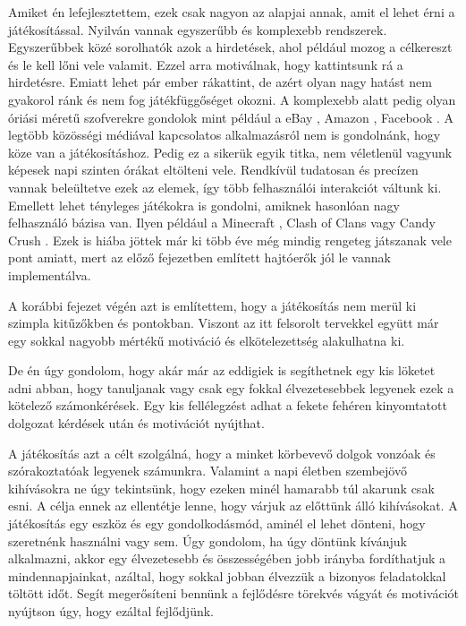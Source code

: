 


Amiket én lefejlesztettem, ezek csak nagyon az alapjai annak, amit el lehet érni a játékosítással. Nyilván vannak egyszerűbb és komplexebb rendszerek. Egyszerűbbek közé sorolhatók azok a hirdetések, ahol például mozog a célkereszt és le kell lőni vele valamit. Ezzel arra motiválnak, hogy kattintsunk rá a hirdetésre. Emiatt lehet pár ember rákattint, de azért olyan nagy hatást nem gyakorol ránk és nem fog játékfüggőséget okozni. A komplexebb alatt pedig olyan óriási méretű szofverekre gondolok mint például a eBay \cite{ebay}, Amazon \cite{amazon}, Facebook \cite{facebook}. A legtöbb közösségi médiával kapcsolatos alkalmazásról nem is gondolnánk, hogy köze van a játékosításhoz. Pedig ez a sikerük egyik titka, nem véletlenül vagyunk képesek napi szinten órákat eltölteni vele. Rendkívül tudatosan és precízen vannak beleültetve ezek az elemek, így több felhasználói interakciót váltunk ki. Emellett lehet tényleges játékokra is gondolni, amiknek hasonlóan nagy felhasználó bázisa van. Ilyen például a Minecraft \cite{minecraft}, Clash of Clans \cite{clashOfClans} vagy Candy Crush \cite{candycrush}. Ezek is hiába jöttek már ki több éve még mindig rengeteg játszanak vele pont amiatt, mert az előző fejezetben említett hajtóerők jól le vannak implementálva. \newline

A korábbi fejezet végén azt is említettem, hogy a játékosítás nem merül ki szimpla kitűzőkben és pontokban. Viszont az itt felsorolt tervekkel együtt már egy sokkal nagyobb mértékű motiváció és elkötelezettség alakulhatna ki. \newline

De én úgy gondolom, hogy akár már az eddigiek is segíthetnek egy kis löketet adni abban, hogy tanuljanak vagy csak egy fokkal élvezetesebbek legyenek ezek a kötelező számonkérések. Egy kis fellélegzést adhat a fekete fehéren kinyomtatott dolgozat kérdések után és motivációt nyújthat. \newline

A játékosítás azt a célt szolgálná, hogy a minket körbevevő dolgok vonzóak és szórakoztatóak legyenek számunkra. Valamint a napi életben szembejövő kihívásokra ne úgy tekintsünk, hogy ezeken minél hamarabb túl akarunk csak esni. A célja ennek az ellentétje lenne, hogy várjuk az előttünk álló kihívásokat. A játékosítás egy eszköz és egy gondolkodásmód, aminél el lehet dönteni, hogy szeretnénk használni vagy sem. Úgy gondolom, ha úgy döntünk kívánjuk alkalmazni, akkor egy élvezetesebb és összességében jobb irányba fordíthatjuk a mindennapjainkat, azáltal, hogy sokkal jobban élvezzük a bizonyos feladatokkal töltött időt. Segít megerősíteni bennünk a fejlődésre törekvés vágyát és motivációt nyújtson úgy, hogy ezáltal fejlődjünk.